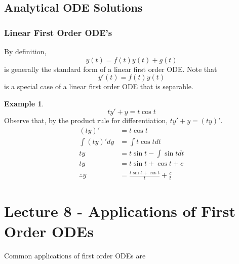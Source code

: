 \documentclass{report}
\theoremstyle{definition}
\newtheorem{example}{Example}
\theoremstyle{plain}
\theoremstyle{remark}
\begin{document}
\subsection{Analytical ODE Solutions}
\subsubsection{Linear First Order ODE's}
By definition,
\[y(t) = f(t)y(t) + g(t)\]
is generally the standard form of a linear first order ODE. Note that 
\[y'(t) = f(t)y(t)\]
is a special case of a linear first order ODE that is separable.

\begin{example}
      \[ty' + y = t\cos t\]
      Observe that, by the product rule for differentiation, \(ty' + y = (ty)'\).
      \begin{align*}
            (ty)' &= t\cos t\\
            \int (ty)' dy &= \int t \cos t dt\\ 
            ty &= t\sin t - \int \sin t dt \\
            ty &= t\sin t + \cos t + c\\
            \therefore y &= \frac{t\sin t + \cos t}{t} + \frac{c}{t}
      \end{align*}

      
\end{example}

\section{Lecture 8 - Applications of First Order ODEs}
Common applications of first order ODEs are
\end{document}
